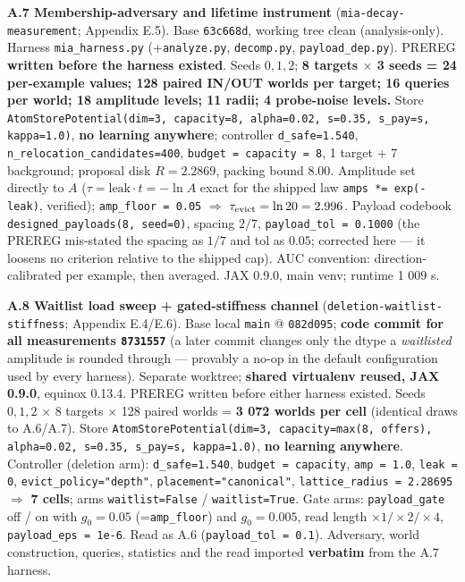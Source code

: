 \documentclass{article}
\begin{document}
\textbf{A.7 Membership-adversary and lifetime instrument} (\texttt{mia-decay-measurement}; Appendix E.5). Base \texttt{63c668d}, working tree clean (analysis-only). Harness \texttt{mia\_harness.py} (+\texttt{analyze.py}, \texttt{decomp.py}, \texttt{payload\_dep.py}). PREREG \textbf{written before the harness existed}. Seeds $0,1,2$; \textbf{8 targets $\times$ 3 seeds = 24 per-example values; 128 paired IN/OUT worlds per target; 16 queries per world; 18 amplitude levels; 11 radii; 4 probe-noise levels.} Store \texttt{AtomStorePotential(dim=3, capacity=8, alpha=0.02, s=0.35, s\_pay=s, kappa=1.0)}, \textbf{no learning anywhere}; controller \texttt{d\_safe=1.540}, \texttt{n\_relocation\_candidates=400}, \texttt{budget = capacity = 8}, 1 target + 7 background; proposal disk $R=2.2869$, packing bound $8.00$. Amplitude set directly to $A$ ($\tau=\text{leak}\cdot t=-\ln A$ exact for the shipped law \texttt{amps *= exp(-leak)}, verified); \texttt{amp\_floor = 0.05} $\Rightarrow$ $\tau_{\rm evict}=\ln20=2.996$. Payload codebook \texttt{designed\_payloads(8, seed=0)}, spacing $2/7$, \texttt{payload\_tol = 0.1000} (the PREREG mis-stated the spacing as $1/7$ and tol as $0.05$; corrected here --- it loosens no criterion relative to the shipped cap). AUC convention: direction-calibrated per example, then averaged. JAX 0.9.0, main venv; runtime 1 009 s.

\textbf{A.8 Waitlist load sweep + gated-stiffness channel} (\texttt{deletion-waitlist-stiffness}; Appendix E.4/E.6). Base local \texttt{main} @ \texttt{082d095}; \textbf{code commit for all measurements \texttt{8731557}} (a later commit changes only the dtype a \emph{waitlisted} amplitude is rounded through --- provably a no-op in the default configuration used by every harness). Separate worktree; \textbf{shared virtualenv reused, JAX 0.9.0}, equinox 0.13.4. PREREG written before either harness existed. Seeds $0,1,2$ $\times$ 8 targets $\times$ 128 paired worlds = \textbf{3 072 worlds per cell} (identical draws to A.6/A.7). Store \texttt{AtomStorePotential(dim=3, capacity=max(8, offers), alpha=0.02, s=0.35, s\_pay=s, kappa=1.0)}, \textbf{no learning anywhere}. Controller (deletion arm): \texttt{d\_safe=1.540}, \texttt{budget = capacity}, \texttt{amp = 1.0}, \texttt{leak = 0}, \texttt{evict\_policy="depth"}, \texttt{placement="canonical"}, \texttt{lattice\_radius = 2.28695} $\Rightarrow$ \textbf{7 cells}; arms \texttt{waitlist=False} / \texttt{waitlist=True}. Gate arms: \texttt{payload\_gate} off / on with $g_0=0.05$ (=\texttt{amp\_floor}) and $g_0=0.005$, read length $\times1/\times2/\times4$, \texttt{payload\_eps = 1e-6}. Read as A.6 (\texttt{payload\_tol = 0.1}). Adversary, world construction, queries, statistics and the read imported \textbf{verbatim} from the A.7 harness.
\end{document}
